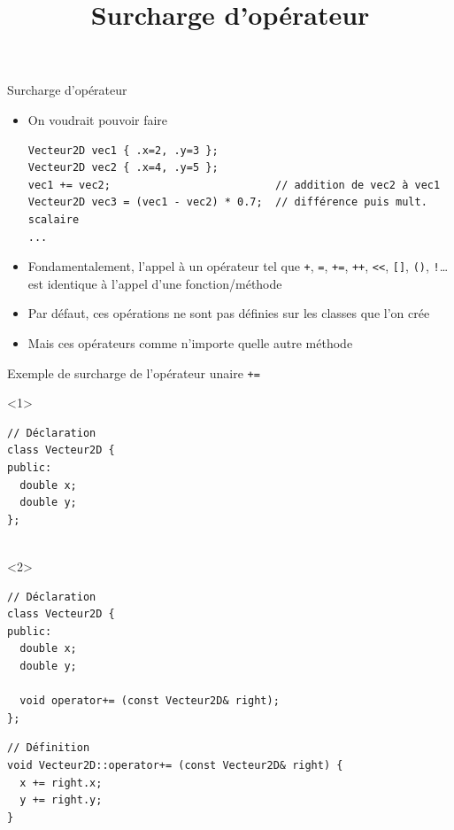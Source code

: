 \documentclass[c]{beamer}
\title{Surcharge d'opérateur}
\begin{document}
\maketitle


\begin{frame}[fragile]{Surcharge d'opérateur}

\begin{itemize}[<+->]
\item On voudrait pouvoir faire
\begin{verbatim}
Vecteur2D vec1 { .x=2, .y=3 };
Vecteur2D vec2 { .x=4, .y=5 };
vec1 += vec2;                          // addition de vec2 à vec1
Vecteur2D vec3 = (vec1 - vec2) * 0.7;  // différence puis mult. scalaire
...
\end{verbatim}

\item Fondamentalement, l'appel à un opérateur tel que \texttt{+}, \texttt{=}, \texttt{+=}, \texttt{++}, \texttt{<<}, \texttt{[]}, \texttt{()}, \texttt{!}\ldots{} est identique à l'appel d'une fonction/méthode

\item Par défaut, ces opérations ne sont pas définies sur les classes que l'on crée

\item Mais  ces opérateurs comme n'importe quelle autre méthode
\end{itemize}

\end{frame}


\begin{frame}[fragile]{Exemple de surcharge de l'opérateur unaire \texttt{+=}}

\begin{onlyenv}<1>
\begin{verbatim}
// Déclaration
class Vecteur2D {
public:
  double x;
  double y;
};


\end{verbatim}
\end{onlyenv}
\begin{onlyenv}<2>
\begin{verbatim}
// Déclaration
class Vecteur2D {
public:
  double x;
  double y;

  void operator+= (const Vecteur2D& right);
};
\end{verbatim}
\end{onlyenv}
\pause
\vspace{1em}
\begin{verbatim}
// Définition
void Vecteur2D::operator+= (const Vecteur2D& right) {
  x += right.x;
  y += right.y;
}
\end{verbatim}
\end{frame}
\end{document}
